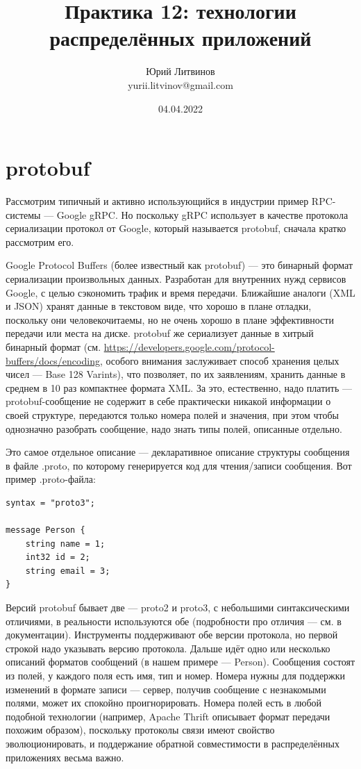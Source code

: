 \documentclass[a5paper]{article}
\title{Практика 12: технологии распределённых приложений}
\author{Юрий Литвинов\\\small{yurii.litvinov@gmail.com}}
\date{04.04.2022}
\begin{document}
\maketitle
\thispagestyle{empty}

\section{protobuf}

Рассмотрим типичный и активно использующийся в индустрии пример RPC-системы --- Google gRPC. Но поскольку gRPC использует в качестве протокола сериализации протокол от Google, который называется protobuf, сначала кратко рассмотрим его.

Google Protocol Buffers (более известный как protobuf) --- это бинарный формат сериализации произвольных данных. Разработан для внутренних нужд сервисов Google, с целью сэкономить трафик и время передачи. Ближайшие аналоги (XML и JSON) хранят данные в текстовом виде, что хорошо в плане отладки, поскольку они человекочитаемы, но не очень хорошо в плане эффективности передачи или места на диске. protobuf же сериализует данные в хитрый бинарный формат (см. \url{https://developers.google.com/protocol-buffers/docs/encoding}, особого внимания заслуживает способ хранения целых чисел --- Base 128 Varints), что позволяет, по их заявлениям, хранить данные в среднем в 10 раз компактнее формата XML. За это, естественно, надо платить --- protobuf-сообщение не содержит в себе практически никакой информации о своей структуре, передаются только номера полей и значения, при этом чтобы однозначно разобрать сообщение, надо знать типы полей, описанные отдельно.

Это самое отдельное описание --- декларативное описание структуры сообщения в файле .proto, по которому генерируется код для чтения/записи сообщения. Вот пример .proto-файла:

\begin{verbatim}
syntax = "proto3";

message Person {
    string name = 1;
    int32 id = 2;
    string email = 3;
}
\end{verbatim}

Версий protobuf бывает две --- proto2 и proto3, с небольшими синтаксическими отличиями, в реальности используются обе (подробности про отличия --- см. в документации). Инструменты поддерживают обе версии протокола, но первой строкой надо указывать версию протокола. Дальше идёт одно или несколько описаний форматов сообщений (в нашем примере --- Person). Сообщения состоят из полей, у каждого поля есть имя, тип и номер. Номера нужны для поддержки изменений в формате записи --- сервер, получив сообщение с незнакомыми полями, может их спокойно проигнорировать. Номера полей есть в любой подобной технологии (например, Apache Thrift описывает формат передачи похожим образом), поскольку протоколы связи имеют свойство эволюционировать, и поддержание обратной совместимости в распределённых приложениях весьма важно.
\end{document}
